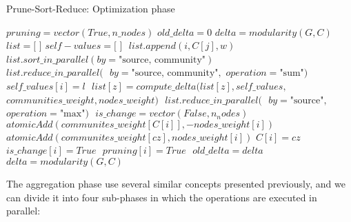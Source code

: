 \begin{algorithm}
	\caption{Prune-Sort-Reduce: Optimization phase}\label{alg:sort-optimization}
\begin{algorithmic}
	\State $pruning = vector(True, n\_nodes)$
	\State $old\_delta = 0$
	\State $delta = modularity(G,C)$
	\State $ $
		\State $list = \text{[ ]}$
		\State $self-values = \text{[ ]}$
		\State $ $
				\State $list.append(i,C[j],w)$
			\EndIf
		\EndFor 
		\State $ $
		\State $list.sort\_in\_parallel(by= \text{"source, community"})$
		\State $ $
		\State $list.reduce\_in\_parallel(\text{ }by= \text{"source, community"}, $
		\Statex[9] $operation= \text{"sum"})$
		\State $ $
			\State $self\_values[i] = l$
		\EndIf
		\EndFor
		\State $ $
			\State $list[z] = compute\_delta(list[z], self\_values,$ 
			\Statex[10] $communities\_weight, nodes\_weight)$
		\EndFor
		\State $ $
		\State $list.reduce\_in\_parallel(\text{ }by= \text{"source"},$
		\Statex[9] $operation= \text{"max"})$
		\State $ $
		\State $is\_change = vector(False, n_nodes)$
				\State $atomicAdd(communites\_weight[C[i]], -nodes\_weight[i])$
				\State $atomicAdd(communites\_weight[cz], nodes\_weight[i])$
				\State $C[i] = cz$
				\State $is\_change[i] = True$
			\EndIf
		\EndFor
		\State $ $
				\State $pruning[i] = True$
			\EndIf
		\EndFor
		\State $ $
		\State $old\_delta = delta$
		\State $delta = modularity(G,C)$
	\EndWhile
	\EndProcedure
	\end{algorithmic}
\end{algorithm}
\newpage
\noindent The aggregation phase use several similar concepts presented previously, and we can divide it into four sub-phases in which the operations are executed in parallel:
